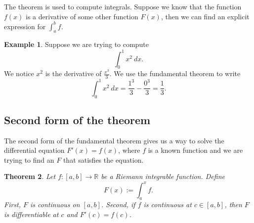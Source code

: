 \documentclass[12pt]{book}
\newcommand{\R}{{\mathbb{R}}}
\theoremstyle{plain}
\newtheorem{thm}{Theorem}[section]
\theoremstyle{remark}
\theoremstyle{definition}
\theoremstyle{exercise}
\theoremstyle{example}
\newtheorem{example}[thm]{Example}
\begin{document}
The theorem is used to compute integrals.  Suppose we know that
the function $f(x)$ is a derivative of some other function $F(x)$,
then we can find an explicit expression for $\int_a^b f$. 

\begin{example}
Suppose we are trying to compute
\begin{equation*}
\int_0^1 x^2 ~dx .
\end{equation*}
We notice $x^2$ is the derivative of $\frac{x^3}{3}$.  We
use the fundamental theorem to write 
\begin{equation*}
\int_0^1 x^2 ~dx =
\frac{1^3}{3}
-
\frac{0^3}{3}
= \frac{1}{3}.
\end{equation*}
\end{example}

\subsection{Second form of the theorem}

The second form of the fundamental theorem gives us a way to solve
the differential equation $F'(x) = f(x)$, where $f$ is a known
function and we are trying to find an $F$ that satisfies the equation.

\begin{thm}
Let $f \colon [a,b] \to \R$ be a Riemann integrable function.  Define
\begin{equation*}
F(x) := \int_a^x f .
\end{equation*}
First, $F$ is continuous on $[a,b]$.  Second,
if $f$ is continuous at $c \in [a,b]$, then $F$ is differentiable at $c$
and $F'(c) = f(c)$.
\end{thm}
\end{document}
